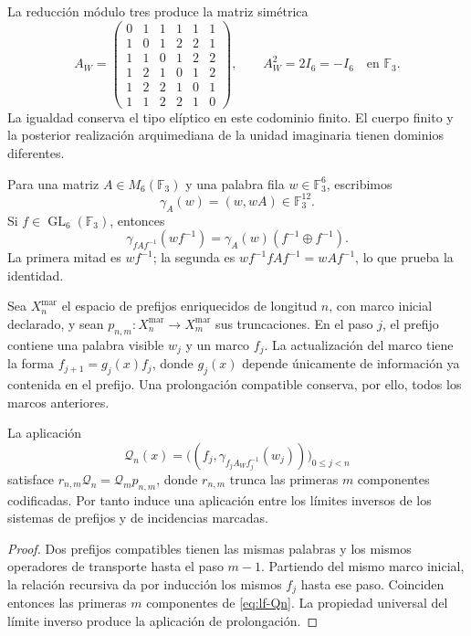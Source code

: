 La reducción módulo tres produce la matriz simétrica
\begin{equation}
 A_W=
 \begin{pmatrix}
 0&1&1&1&1&1\\
 1&0&1&2&2&1\\
 1&1&0&1&2&2\\
 1&2&1&0&1&2\\
 1&2&2&1&0&1\\
 1&1&2&2&1&0
 \end{pmatrix},
 \qquad A_W^2=2I_6=-I_6
 \quad\text{en }\mathbb F_3.
 \label{eq:lf-aw}
\end{equation}
La igualdad conserva el tipo elíptico en este codominio finito.
El cuerpo finito y la posterior realización arquimediana de la
unidad imaginaria tienen dominios diferentes.

Para una matriz \(A\in M_6(\mathbb F_3)\) y una palabra fila
\(w\in\mathbb F_3^6\), escribimos
\[
 \gamma_A(w)=(w,wA)\in\mathbb F_3^{12}.
\]
Si \(f\in\operatorname{GL}_6(\mathbb F_3)\), entonces
\begin{equation}
 \gamma_{fAf^{-1}}(wf^{-1})
   =\gamma_A(w)(f^{-1}\oplus f^{-1}).
 \label{eq:lf-frame-covariance}
\end{equation}
La primera mitad es \(wf^{-1}\); la segunda es
\(wf^{-1}fAf^{-1}=wAf^{-1}\), lo que prueba la identidad.

Sea \(X_n^{\mathrm{mar}}\) el espacio de prefijos enriquecidos de
longitud \(n\), con marco inicial declarado, y sean
\(p_{n,m}:X_n^{\mathrm{mar}}\to X_m^{\mathrm{mar}}\) sus
truncaciones. En el paso \(j\), el prefijo contiene una palabra
visible \(w_j\) y un marco \(f_j\). La actualización del marco
tiene la forma \(f_{j+1}=g_j(x)f_j\), donde \(g_j(x)\) depende
únicamente de información ya contenida en el prefijo. Una
prolongación compatible conserva, por ello, todos los marcos
anteriores.

\begin{proposition}
\label{prop:lf-incidence-naturality}
La aplicación
\begin{equation}
 \mathcal Q_n(x)=
 \bigl((f_j,\gamma_{f_jA_Wf_j^{-1}}(w_j))\bigr)_{0\leq j<n}
 \label{eq:lf-Qn}
\end{equation}
satisface \(r_{n,m}\mathcal Q_n=\mathcal Q_mp_{n,m}\), donde \(r_{n,m}\) trunca
las primeras \(m\) componentes codificadas. Por tanto induce una
aplicación entre los límites inversos de los sistemas de
prefijos y de incidencias marcadas.
\end{proposition}
\begin{proof}
Dos prefijos compatibles tienen las mismas palabras y los mismos
operadores de transporte hasta el paso \(m-1\). Partiendo del
mismo marco inicial, la relación recursiva da por inducción los
mismos \(f_j\) hasta ese paso. Coinciden entonces las primeras
\(m\) componentes de \eqref{eq:lf-Qn}. La propiedad universal
del límite inverso produce la aplicación de prolongación.
\end{proof}

